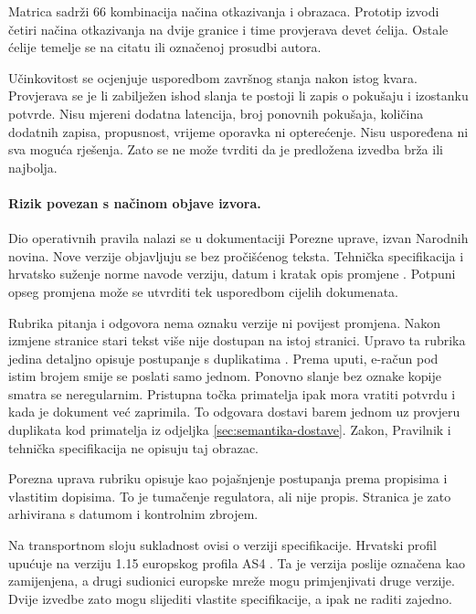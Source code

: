 Matrica sadrži 66 kombinacija načina otkazivanja i obrazaca. Prototip izvodi
četiri načina otkazivanja na dvije granice i time provjerava devet ćelija.
Ostale ćelije temelje se na citatu ili označenoj prosudbi autora.

Učinkovitost se ocjenjuje usporedbom završnog stanja nakon istog kvara.
Provjerava se je li zabilježen ishod slanja te postoji li zapis o pokušaju i
izostanku potvrde. Nisu mjereni dodatna latencija, broj ponovnih pokušaja,
količina dodatnih zapisa, propusnost, vrijeme oporavka ni opterećenje. Nisu
uspoređena ni sva moguća rješenja. Zato se ne može tvrditi da je predložena
izvedba brža ili najbolja.

\paragraph{Rizik povezan s načinom objave izvora.}
Dio operativnih pravila nalazi se u dokumentaciji Porezne uprave, izvan
Narodnih novina. Nove verzije objavljuju se bez pročišćenog teksta. Tehnička
specifikacija i hrvatsko suženje norme navode verziju, datum i kratak opis
promjene \cite{pu2026tehspec,pu2026hrcius}. Potpuni opseg promjena može se
utvrditi tek usporedbom cijelih dokumenata.

Rubrika pitanja i odgovora nema oznaku verzije ni povijest promjena. Nakon
izmjene stranice stari tekst više nije dostupan na istoj stranici. Upravo ta
rubrika jedina detaljno opisuje postupanje s duplikatima
\cite{pu2026pitanjaodgovori}. Prema uputi, e-račun pod istim brojem smije se
poslati samo jednom. Ponovno slanje bez oznake kopije smatra se neregularnim.
Pristupna točka primatelja ipak mora vratiti potvrdu i kada je dokument već
zaprimila. To odgovara dostavi barem jednom uz provjeru duplikata kod
primatelja iz odjeljka \ref{sec:semantika-dostave}. Zakon, Pravilnik i
tehnička specifikacija ne opisuju taj obrazac.

Porezna uprava rubriku opisuje kao pojašnjenje postupanja prema propisima i
vlastitim dopisima. To je tumačenje regulatora, ali nije propis. Stranica je
zato arhivirana s datumom i kontrolnim zbrojem.

Na transportnom sloju sukladnost ovisi o verziji specifikacije. Hrvatski
profil upućuje na verziju 1.15 europskog profila AS4
\cite{cef2020as4v115}. Ta je verzija poslije označena kao zamijenjena, a
drugi sudionici europske mreže mogu primjenjivati druge verzije. Dvije
izvedbe zato mogu slijediti vlastite specifikacije, a ipak ne raditi zajedno.
